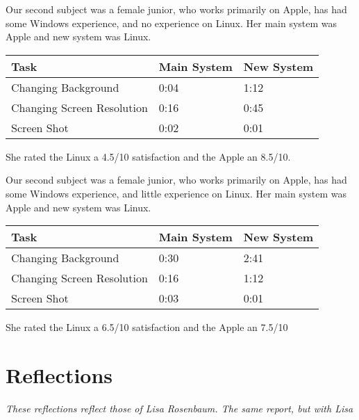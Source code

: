 \documentclass[12pt, onesided, letterpaper]{report}
\begin{document}
Our second subject was a female junior, who works primarily on Apple, has had some Windows experience, and no experience on Linux.  Her main system was Apple and new system was Linux.
\begin{center}
    \begin{tabular}{ | l | l | l |}
    \hline
    Task &Main System & New System  \\ \hline
    Changing Background & 0:04 & 1:12  \\ \hline
    Changing Screen Resolution & 0:16 & 0:45  \\ \hline
    Screen Shot & 0:02 & 0:01 \\
    \hline
    \end{tabular}
\end{center}
She rated the Linux a 4.5/10 satisfaction and the Apple an 8.5/10.

Our second subject was a female junior, who works primarily on Apple, has had some Windows experience, and little experience on Linux. Her main system was Apple and new system was Linux.
\begin{center}
    \begin{tabular}{ | l | l | l |}
    \hline
    Task &Main System & New System  \\ \hline
    Changing Background & 0:30 & 2:41  \\ \hline
    Changing Screen Resolution & 0:16 & 1:12  \\ \hline
    Screen Shot & 0:03 & 0:01 \\
    \hline
    \end{tabular}
\end{center}
She rated the Linux a 6.5/10 satisfaction and the Apple an 7.5/10
\pagebreak
\section*{Reflections}
\textit{These reflections reflect those of Lisa Rosenbaum.  The same report, but with Lisa}
\end{document}
